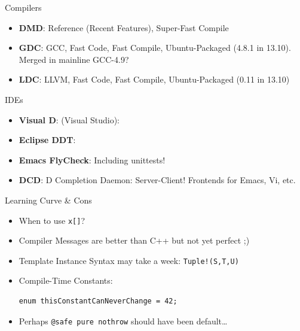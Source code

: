 \documentclass[xcolor=dvipsnames]{beamer}
\begin{document}
\begin{frame}[fragile]{Compilers}
  \begin{itemize}[<+->]
  \item \textbf{DMD}: Reference (Recent Features), Super-Fast Compile
  \item \textbf{GDC}: GCC, Fast Code, Fast Compile, Ubuntu-Packaged (4.8.1 in
    13.10). Merged in mainline GCC-4.9?
  \item \textbf{LDC}: LLVM, Fast Code, Fast Compile, Ubuntu-Packaged (0.11 in
    13.10)
  \end{itemize}
\end{frame}

\begin{frame}[fragile]{IDEs}
  \begin{itemize}[<+->]
  \item \textbf{Visual D}: (Visual Studio):
  \item \textbf{Eclipse DDT}:
  \item \textbf{Emacs FlyCheck}: Including unittests!
  \item \textbf{DCD}: D Completion Daemon: Server-Client! Frontends for Emacs,
    Vi, etc.
  \end{itemize}
\end{frame}

\begin{frame}[fragile]{Learning Curve \& Cons}
  \begin{itemize}[<+->]
  \item When to use \texttt{x[]}?
  \item Compiler Messages are better than C++ but not yet perfect ;)
  \item Template Instance Syntax may take a week: \texttt{Tuple!(S,T,U)}
  \item Compile-Time Constants:
\begin{lstlisting}[frame=single]
  enum thisConstantCanNeverChange = 42;
\end{lstlisting}
  \item Perhaps \texttt{@safe pure nothrow} should have been default\ldots
  \end{itemize}
\end{frame}
\end{document}
